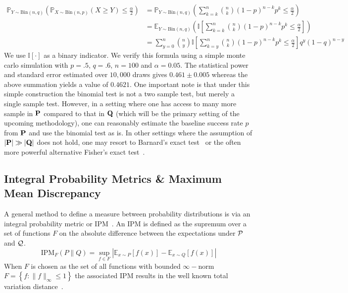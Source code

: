 \begin{align*}
    \mathbb{P}_{Y\sim \text{Bin}(n, q)} \left( \mathbb{P}_{X\sim \text{Bin}(n, p)}(X \geq Y) \leq \frac{\alpha}{2} \right)&= \mathbb{P}_{Y\sim \text{Bin}(n, q)}\left(  \sum_{k=k}^n \binom{n}{k} (1-p)^{n-k} p^k  \leq \frac{\alpha}{2} \right)\\
    &= \mathbb{E}_{Y\sim \text{Bin}(n, q)}\left(  \mathbb{I}\left[\sum_{k=k}^n \binom{n}{k} (1-p)^{n-k} p^k  \leq \frac{\alpha}{2}\right] \right)\\
    &= \sum_{y=0}^n \binom{n}{y} \mathbb{I}\left[  \sum_{k=y}^n \binom{n}{k} (1-p)^{n-k} p^k \leq \frac{\alpha}{2} \right] q^y (1-q)^{n-y}
\end{align*}
We use $\mathbb{I}[\cdot]$ as a binary indicator.
We verify this formula using a simple monte carlo simulation with $p=.5$, $q=.6$, $n=100$ and $\alpha=0.05$.
The statistical power and standard error estimated over $10,000$ draws gives $0.461\pm 0.005$ whereas the above summation yields a value of $0.4621$.
One important note is that under this simple construction the binomial test is not a two sample test, but merely a single sample test.
However, in a setting where one has access to many more sample in $\mathbf{P}$ compared to that in $\mathbf{Q}$
(which will be the primary setting of the upcoming methodology), one can reasonably estimate the baseline success rate $p$ from $\mathbf{P}$ and use the binomial test as is.
In other settings where the assumption of $|\mathbf{P}|\gg|\mathbf{Q}|$ does not hold, one may resort to Barnard's exact test~\citep{Barnardp88:online} or the often more powerful alternative Fisher's exact test~\citep{fisher_r_a_1922_1449484}.

\subsection*{Integral Probability Metrics \& Maximum Mean Discrepancy}
A general method to define a measure between probability distributions is via an integral probability metric or IPM~\citep{IPMS}.
An IPM is defined as the supremum over a set of functions $F$ on the absolute difference between the expectations under $\mathcal{P}$ and $\mathcal{Q}$.
\begin{equation*}
    \text{IPM}_F(P \| Q)=\sup_{f\in F}|\mathbb{E}_{x\sim P}\left[ f(x)\right] - \mathbb{E}_{x\sim Q}\left[ f(x)\right]|
\end{equation*}
When $F$ is chosen as the set of all functions with bounded $\infty-$norm $F = \left\{f:\|f\|_{\infty} \leq 1\right\}$
the associated IPM results in the well known total variation distance~\citep{ipm-divergences}.

